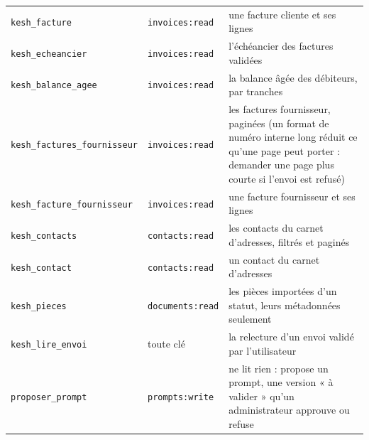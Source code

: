 \documentclass[a4paper,11pt,oneside]{article}
\begin{document}
\begin{center}
\begin{tabular}{p{4.6cm}p{2.4cm}p{7.2cm}}
\texttt{kesh\_facture} & \texttt{invoices:read} & une facture cliente et ses lignes \\
\texttt{kesh\_echeancier} & \texttt{invoices:read} & l'échéancier des factures validées \\
\texttt{kesh\_balance\_agee} & \texttt{invoices:read} & la balance âgée des débiteurs, par tranches \\
\texttt{kesh\_factures\_fournisseur} & \texttt{invoices:read} & les factures fournisseur, paginées (un format de numéro interne long réduit ce qu'une page peut porter : demander une page plus courte si l'envoi est refusé) \\
\texttt{kesh\_facture\_fournisseur} & \texttt{invoices:read} & une facture fournisseur et ses lignes \\
\texttt{kesh\_contacts} & \texttt{contacts:read} & les contacts du carnet d'adresses, filtrés et paginés \\
\texttt{kesh\_contact} & \texttt{contacts:read} & un contact du carnet d'adresses \\
\texttt{kesh\_pieces} & \texttt{documents:read} & les pièces importées d'un statut, leurs métadonnées seulement \\
\texttt{kesh\_lire\_envoi} & toute clé & la relecture d'un envoi validé par l'utilisateur \\
\texttt{proposer\_prompt} & \texttt{prompts:write} & ne lit rien : propose un prompt, une version « à valider » qu'un administrateur approuve ou refuse \\
\end{tabular}
\end{center}
\end{document}
